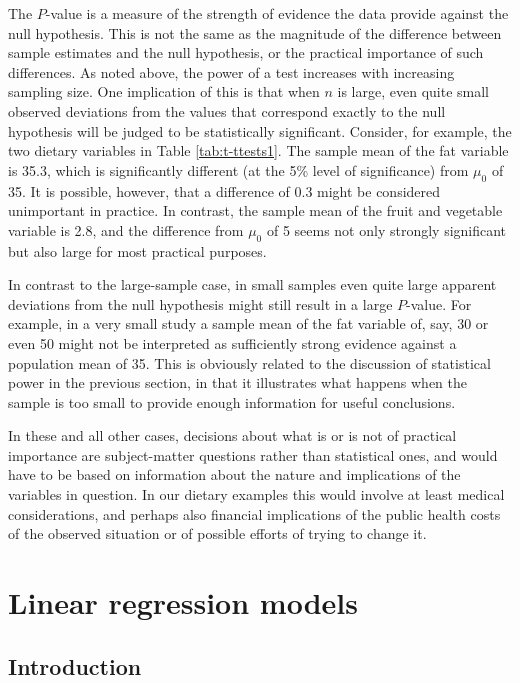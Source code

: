 \documentclass[11pt,a4paper,openany]{book}
\begin{document}
The \(P\)-value is a measure of the strength of evidence the data
provide against the null hypothesis. This is not the same as the
magnitude of the difference between sample estimates and the null
hypothesis, or the practical importance of such differences. As noted
above, the power of a test increases with increasing sampling size. One
implication of this is that when \(n\) is large, even quite small
observed deviations from the values that correspond exactly to the null
hypothesis will be judged to be statistically significant. Consider, for
example, the two dietary variables in Table \ref{tab:t-ttests1}. The
sample mean of the fat variable is 35.3, which is significantly
different (at the 5\% level of significance) from \(\mu_{0}\) of 35. It
is possible, however, that a difference of 0.3 might be considered
unimportant in practice. In contrast, the sample mean of the fruit and
vegetable variable is 2.8, and the difference from \(\mu_{0}\) of 5
seems not only strongly significant but also large for most practical
purposes.

In contrast to the large-sample case, in small samples even quite large
apparent deviations from the null hypothesis might still result in a
large \(P\)-value. For example, in a very small study a sample mean of
the fat variable of, say, 30 or even 50 might not be interpreted as
sufficiently strong evidence against a population mean of 35. This is
obviously related to the discussion of statistical power in the previous
section, in that it illustrates what happens when the sample is too
small to provide enough information for useful conclusions.

In these and all other cases, decisions about what is or is not of
practical importance are subject-matter questions rather than
statistical ones, and would have to be based on information about the
nature and implications of the variables in question. In our dietary
examples this would involve at least medical considerations, and perhaps
also financial implications of the public health costs of the observed
situation or of possible efforts of trying to change it.

\chapter{Linear regression models}\label{c-regression}

\section{Introduction}\label{s-regression-intro}
\end{document}
